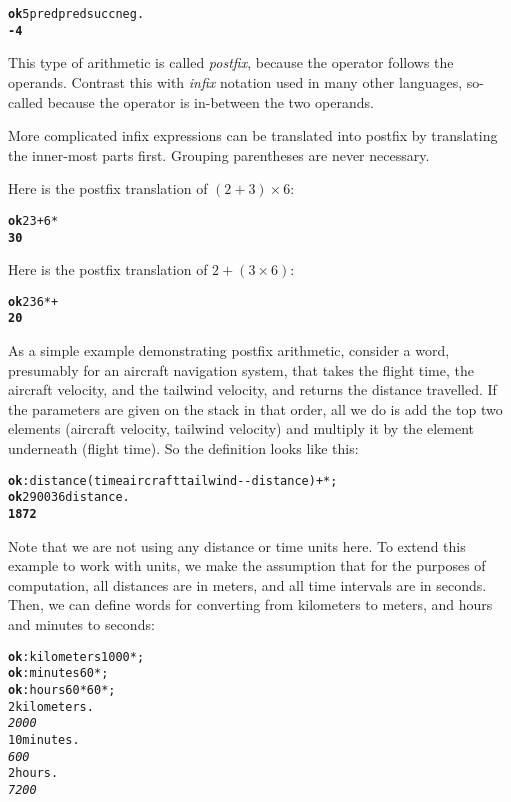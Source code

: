 \documentclass[english]{book}
\begin{document}
\begin{alltt}
\textbf{ok} 5 pred pred succ neg .
\textbf{-4}
\end{alltt}

This type of arithmetic is called \emph{postfix}, because the operator
follows the operands. Contrast this with \emph{infix} notation used
in many other languages, so-called because the operator is in-between
the two operands.

More complicated infix expressions can be translated into postfix
by translating the inner-most parts first. Grouping parentheses are
never necessary.

Here is the postfix translation of $(2 + 3) \times 6$:

\begin{alltt}
\textbf{ok} 2 3 + 6 {*}
\textbf{30}
\end{alltt}

Here is the postfix translation of $2 + (3 \times 6)$:

\begin{alltt}
\textbf{ok} 2 3 6 {*} +
\textbf{20}
\end{alltt}

As a simple example demonstrating postfix arithmetic, consider a word, presumably for an aircraft navigation system, that takes the flight time, the aircraft
velocity, and the tailwind velocity, and returns the distance travelled.
If the parameters are given on the stack in that order, all we do
is add the top two elements (aircraft velocity, tailwind velocity)
and multiply it by the element underneath (flight time). So the definition
looks like this:

\begin{alltt}
\textbf{ok} : distance ( time aircraft tailwind -{}- distance ) + {*} ;
\textbf{ok} 2 900 36 distance .
\textbf{1872}
\end{alltt}

Note that we are not using any distance or time units here. To extend this example to work with units, we make the assumption that for the purposes of computation, all distances are
in meters, and all time intervals are in seconds. Then, we can define words
for converting from kilometers to meters, and hours and minutes to
seconds:

\begin{alltt}
\textbf{ok} : kilometers 1000 {*} ;
\textbf{ok} : minutes 60 {*} ;
\textbf{ok} : hours 60 {*} 60 {*} ;
2 kilometers .
\emph{2000}
10 minutes .
\emph{600}
2 hours .
\emph{7200}
\end{alltt}
\end{document}

